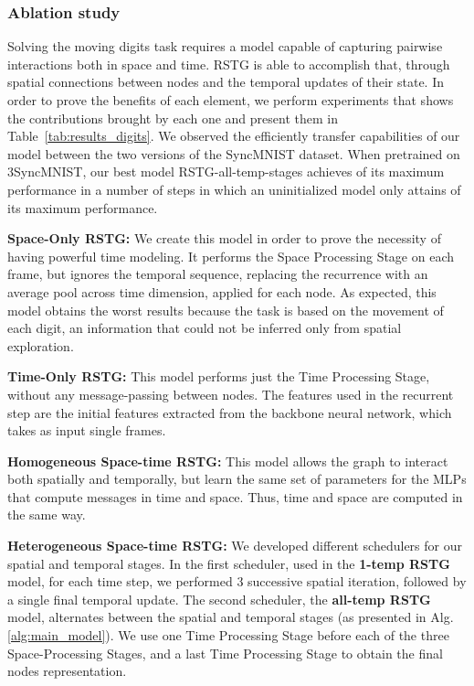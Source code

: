 \documentclass{article}
\begin{document}
\subsubsection{Ablation study} 

Solving the moving digits task requires a model capable of capturing pairwise interactions both in space and time. RSTG is able to accomplish that, through spatial connections between nodes and the temporal updates of their state. In order to prove the benefits of each element, we perform experiments that shows the contributions brought by each one and present them in Table~\ref{tab:results_digits}.
We observed the efficiently transfer capabilities of our model between the two versions of the SyncMNIST dataset. When pretrained on 3SyncMNIST, our best model RSTG-all-temp-stages achieves  of its maximum performance in a number of steps in which an uninitialized model only attains  of its maximum performance.

\textbf{Space-Only RSTG:} We create this model in order to prove the necessity of having powerful time modeling. It performs the Space Processing Stage on each frame, but ignores the temporal sequence, replacing the recurrence with an average pool across time dimension, applied for each node. As expected, this model obtains the worst results because the task is based on the movement of each digit, an information that could not be inferred only from spatial exploration.

\textbf{Time-Only RSTG:} This model performs just the Time Processing Stage, without any message-passing between nodes. The features used in the recurrent step are the initial features extracted from the backbone neural network, which takes as input single frames.

\textbf{Homogeneous Space-time RSTG:} This model allows the graph to interact both spatially and temporally, but learn the same set of parameters for the MLPs that compute messages in time and space. Thus, time and space are computed in the same way.

\newpage
\textbf{Heterogeneous Space-time RSTG:} We developed different schedulers for our spatial and temporal stages. In the first scheduler, used in the \textbf{1-temp RSTG} model, for each time step, we performed 3 successive spatial iteration, followed by a single final temporal update. The second scheduler, the \textbf{all-temp RSTG} model, alternates between the spatial and temporal stages (as presented in Alg.\ref{alg:main_model}).  We use one Time Processing Stage before each of the three Space-Processing Stages, and a last Time Processing Stage to obtain the final nodes representation.
\end{document}
